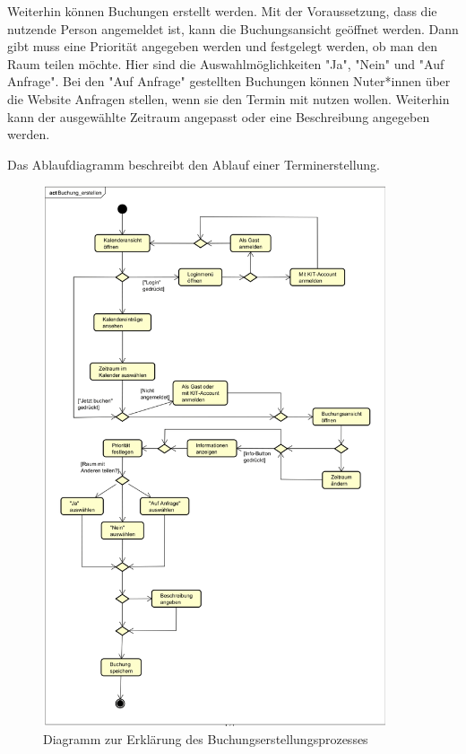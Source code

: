  Weiterhin können Buchungen erstellt werden. Mit der Voraussetzung, dass die nutzende Person angemeldet ist,
kann die Buchungsansicht geöffnet werden. Dann gibt muss eine Priorität angegeben werden und festgelegt werden,
 ob man den Raum teilen möchte. Hier sind die Auswahlmöglichkeiten "Ja", "Nein" und "Auf Anfrage". Bei den "Auf
 Anfrage" gestellten Buchungen können Nuter*innen über die Website Anfragen stellen, wenn sie den Termin mit nutzen
 wollen. Weiterhin kann der ausgewählte Zeitraum angepasst oder eine Beschreibung angegeben werden.

 Das Ablaufdiagramm beschreibt den Ablauf einer Terminerstellung.

\begin{figure}[ht]
    \centering
    \includegraphics[width=0.9\textwidth]{figures/activity/buchungerstellen}
    \caption{Diagramm zur Erklärung des Buchungserstellungsprozesses}
    \label{fig:make-booking-diagram}
\end{figure}

